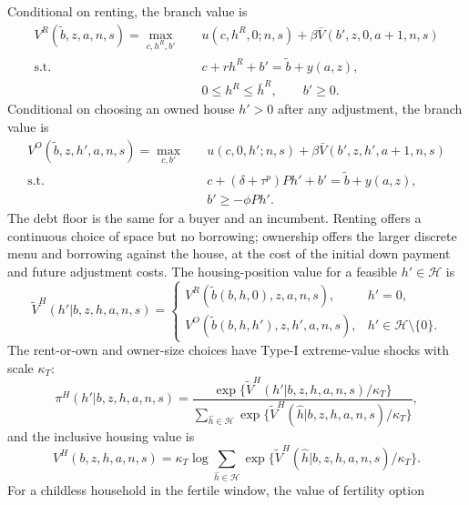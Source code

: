 \documentclass[11pt]{article}
\theoremstyle{definition}
\newcommand{\1}{\mathbf 1}
\newcommand{\HH}{\mathcal H}
\begin{document}
Conditional on renting, the branch value is
\begin{equation}
\begin{aligned}
V^R(\tilde b,z,a,n,s)
=
\max_{c,h^R,b'}\quad
&u(c,h^R,0;n,s)+\beta \bar V(b',z,0,a+1,n,s)\\
\text{s.t.}\quad
&c+r h^R+b'=\tilde b+y(a,z),\\
&0\le h^R\le\bar h^R,\qquad b'\ge0.
\end{aligned}
\label{eq:quant_renter_problem}
\end{equation}
Conditional on choosing an owned house $h'>0$ after any adjustment, the branch
value is
\begin{equation}
\begin{aligned}
V^O(\tilde b,z,h',a,n,s)
=
\max_{c,b'}\quad
&u(c,0,h';n,s)+\beta \bar V(b',z,h',a+1,n,s)\\
\text{s.t.}\quad
&c+(\delta+\tau^p)Ph'+b'=\tilde b+y(a,z),\\
&b'\ge -\phi P h'.
\end{aligned}
\label{eq:quant_owner_problem}
\end{equation}
The debt floor is the same for a buyer and an incumbent. Renting offers a
continuous choice of space but no borrowing;
ownership offers the larger discrete menu and borrowing against the house, at
the cost of the initial down payment and future adjustment costs.
The housing-position value for a feasible $h'\in\HH$ is
\begin{equation}
\widetilde V^H(h'|b,z,h,a,n,s)
=
\begin{cases}
V^R(\tilde b(b,h,0),z,a,n,s), & h'=0,\\
V^O(\tilde b(b,h,h'),z,h',a,n,s), & h'\in\HH\setminus\{0\}.
\end{cases}
\label{eq:quant_housing_branch}
\end{equation}
The rent-or-own and owner-size choices have Type-I extreme-value shocks with
scale $\kappa_T$:
\begin{equation}
\pi^H(h'|b,z,h,a,n,s)
=
\frac{\exp\{\widetilde V^H(h'|b,z,h,a,n,s)/\kappa_T\}}
{\sum_{\hat h\in\HH}
\exp\{\widetilde V^H(\hat h|b,z,h,a,n,s)/\kappa_T\}},
\label{eq:quant_housing_probs}
\end{equation}
and the inclusive housing value is
\begin{equation}
V^H(b,z,h,a,n,s)
=
\kappa_T\log
\sum_{\hat h\in\HH}
\exp\{\widetilde V^H(\hat h|b,z,h,a,n,s)/\kappa_T\}.
\label{eq:quant_housing_iv}
\end{equation}
For a childless household in the fertile window, the value of fertility option
\end{document}

